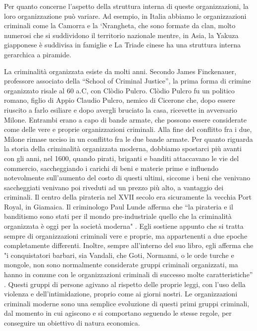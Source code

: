 \documentclass[a4paper, 11pt]{article}
\begin{document}
Per quanto concerne l’aspetto della struttura interna di queste organizzazioni, la loro organizzazione può variare. Ad esempio, in Italia abbiamo le organizzazioni criminali come la Camorra e la ‘Nrangheta, che sono formate da clan, molto numerosi che si suddividono il territorio nazionale mentre, in Asia, la Yakuza giapponese è suddivisa in famiglie e La Triade cinese ha una struttura interna gerarchica a piramide.

\newpage


La criminalità organizzata esiste da molti anni. Secondo James Finckenauer, professore associato della “School of Criminal Justice”, la prima forma di crimine organizzato risale al 60 a.C, con Clòdio Pulcro. Clòdio Pulcro fu un politico romano, figlio di Appio Claudio Pulcro, nemico di Cicerone che, dopo essere riuscito a farlo esiliare e dopo avergli bruciato la casa, ricevette in avversario Milone. Entrambi erano a capo di bande armate, che possono essere considerate come delle vere e proprie organizzazioni criminali. Alla fine del conflitto fra i due, Milone rimase ucciso in un conflitto fra le due bande armate. Per quanto riguarda la storia della criminalità organizzata moderna, dobbiamo spostarci più avanti con gli anni, nel 1600, quando pirati, briganti e banditi attaccavano le vie del commercio, saccheggiando i carichi di beni e materie prime e influendo notevolmente sull’aumento del costo di questi ultimi, siccome i beni che venivano saccheggiati venivano poi riveduti ad un prezzo più alto, a vantaggio dei criminali. Il centro della pirateria nel XVII secolo era sicuramente la vecchia Port Royal, in Giamaica. Il criminologo Paul Lunde afferma che “la pirateria e il banditismo sono stati per il mondo pre-industriale quello che la criminalità organizzata è oggi per la società moderna" . Egli sostiene appunto che si tratta sempre di organizzazioni criminali vere e proprie, ma appartenenti a due epoche completamente differenti. Inoltre, sempre all’interno del suo libro, egli afferma che "i conquistatori barbari, sia Vandali, che Goti, Normanni, o le orde turche e mongole, non sono normalmente considerate gruppi criminali organizzati, ma hanno in comune con le organizzazioni criminali di successo molte caratteristiche” . Questi gruppi di persone agivano al rispetto delle proprie leggi, con l’uso della violenza e dell’intimidazione, proprio come ai giorni nostri. Le organizzazioni criminali moderne sono una semplice evoluzione di questi primi gruppi criminali, dal momento in cui agiscono e si comportano seguendo le stesse regole, per conseguire un obiettivo di natura economica.
\end{document}
